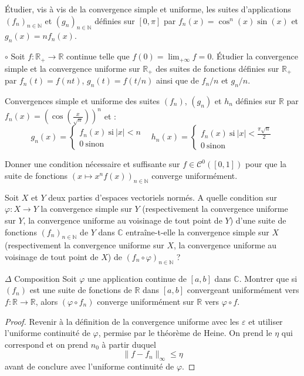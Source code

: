 \documentclass[french,a4paper]{article}
\newcommand{\N}{\mathbb{N}}
\newcommand{\R}{\mathbb{R}}
\newcommand{\C}{\mathbb{C}}
\theoremstyle{plain}
\theoremstyle{definition}
\theoremstyle{remark}
\begin{document}
\begin{ex}{}
	Étudier, vis à vis de la convergence simple et uniforme, les suites d'applications $(f_n)_{n\in\N}$ et $(g_n)_{n\in\N}$ définies sur $[0,\pi]$ par $f_n(x)=\cos^n(x)\sin(x)$ et $g_n(x)=nf_n(x)$.
\end{ex}

\begin{ex}{$\circ$}
	Soit $f:\R_+\to\R$ continue telle que $f(0)=\lim_{+\infty} f=0$. Étudier la convergence simple et la convergence uniforme sur $\R_+$ des suites de fonctions définies sur $\R_+$ par $f_n(t)=f(nt)$, $g_n(t)=f(t/n)$ ainsi que de $f_n/n$ et $g_n/n$.
\end{ex}

\begin{ex}{}
	Convergences simple et uniforme des suites $(f_n)$, $(g_n)$ et $h_n$ définies sur $\R$ par $f_n(x)=\displaystyle\left(\cos\left(\frac{x}{\sqrt{n}}\right)\right)^n$ et : $$g_n(x)=\begin{cases}
		f_n(x)\ \text{si}\ \lvert x\rvert <n \\
		0\ \text{sinon}
	\end{cases}\ \ \ \ h_n(x)=\begin{cases}
	f_n(x)\ \text{si}\ \lvert x\rvert<\frac{\pi\sqrt{n}}{2}\\
	0\ \text{sinon}
	\end{cases}$$
\end{ex}

\begin{ex}{}
	Donner une condition nécessaire et suffisante sur $f\in\mathcal{C}^0([0,1])$ pour que la suite de fonctions $(x\mapsto x^nf(x))_{n\in\N}$ converge uniformément.
\end{ex}

\begin{ex}{}
	Soit $X$ et $Y$ deux parties d'espaces vectoriels normés. A quelle condition sur $\varphi:X\to Y$ la convergence simple sur $Y$ (respectivement la convergence uniforme sur $Y$, la convergence uniforme au voisinage de tout point de $Y$) d'une suite de fonctions $(f_n)_{n\in\N}$ de $Y$ dans $\C$ entraîne-t-elle la convergence simple sur $X$ (respectivement la convergence uniforme sur $X$, la convergence uniforme au voisinage de tout point de $X$) de $(f_n\circ\varphi)_{n\in\N}$ ?
\end{ex}

\begin{ex}{$\Delta$ Composition}
	Soit $\varphi$ une application continue de $[a,b]$ dans $\C$. Montrer que si $(f_n)$ est une suite de fonctions de $\R$ dans $[a,b]$ convergeant uniformément vers $f:\R\to\R$, alors $(\varphi\circ f_n)$ converge uniformément sur $\R$ vers $\varphi\circ f$.
\end{ex}
\begin{proof}
	Revenir à la définition de la convergence uniforme avec les $\varepsilon$ et utiliser l'uniforme continuité de $\varphi$, permise par le théorème de Heine. On prend le $\eta$ qui correspond et on prend $n_0$ à partir duquel $$\lVert f-f_n\rVert_\infty\leqslant\eta$$ avant de conclure avec l'uniforme continuité de $\varphi$.
\end{proof}
\end{document}
